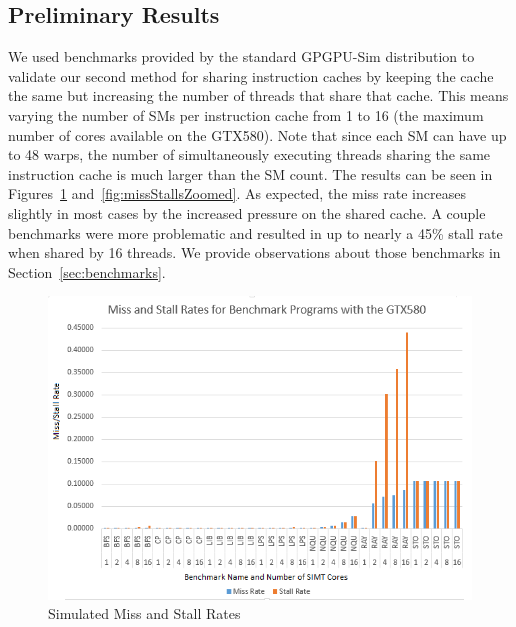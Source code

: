 \subsection{Preliminary Results}

We used benchmarks provided by the standard GPGPU-Sim distribution
to validate our second method for sharing instruction caches by
keeping the cache the same but increasing the number of threads that
share that cache.
This means varying the number of SMs per instruction cache from 1 to
16 (the maximum number of cores available on the GTX580).
Note that since each SM can have up to 48 warps, the number of
simultaneously executing threads sharing the same instruction cache is
much larger than the SM count.
The results can be seen in Figures~\ref{fig:missStalls}
and~\ref{fig:missStallsZoomed}. 
As expected, the miss rate increases slightly in most cases by the
increased pressure on the shared cache.
A couple benchmarks were more problematic and resulted in up to nearly
a 45\% stall rate when shared by 16 threads.
We provide observations about those benchmarks in
Section~\ref{sec:benchmarks}.

\begin{figure}
\centering
\includegraphics[width=\columnwidth]{graphics/miss_stalls_benchmarks.png}
\caption{Simulated Miss and Stall Rates}
\label{fig:missStalls}
\end{figure}

